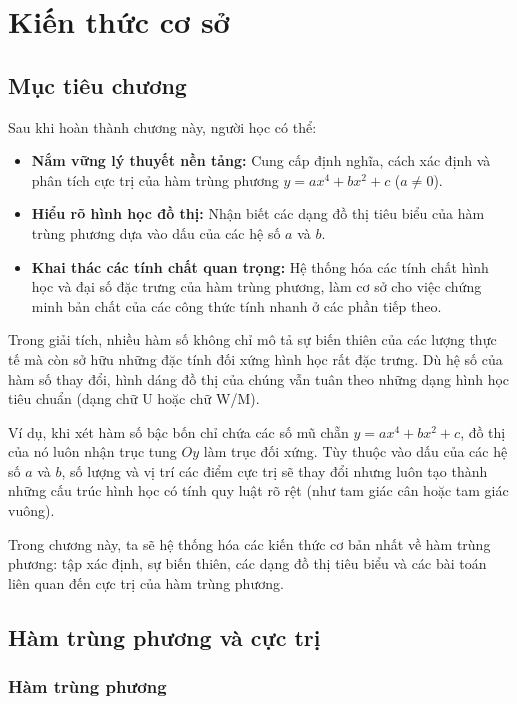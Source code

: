 \section{Kiến thức cơ sở}
\subsection{Mục tiêu chương}
Sau khi hoàn thành chương này, người học có thể:
\begin{itemize}
    \item \textbf{Nắm vững lý thuyết nền tảng:} Cung cấp định nghĩa, cách xác định và phân tích cực trị của hàm trùng phương $y = ax^4 + bx^2 + c$ ($a \neq 0$).
    \item \textbf{Hiểu rõ hình học đồ thị:} Nhận biết các dạng đồ thị tiêu biểu của hàm trùng phương dựa vào dấu của các hệ số $a$ và $b$.
    \item \textbf{Khai thác các tính chất quan trọng:} Hệ thống hóa các tính chất hình học và đại số đặc trưng của hàm trùng phương, làm cơ sở cho việc chứng minh bản chất của các công thức tính nhanh ở các phần tiếp theo.
\end{itemize}
\vspace{0.5cm}
Trong giải tích, nhiều hàm số không chỉ mô tả sự biến thiên của các lượng thực tế mà còn sở hữu những đặc tính đối xứng hình học rất đặc trưng. Dù hệ số của hàm số thay đổi, hình dáng đồ thị của chúng vẫn tuân theo những dạng hình học tiêu chuẩn (dạng chữ U hoặc chữ W/M).

Ví dụ, khi xét hàm số bậc bốn chỉ chứa các số mũ chẵn $y = ax^4 + bx^2 + c$, đồ thị của nó luôn nhận trục tung $Oy$ làm trục đối xứng. Tùy thuộc vào dấu của các hệ số $a$ và $b$, số lượng và vị trí các điểm cực trị sẽ thay đổi nhưng luôn tạo thành những cấu trúc hình học có tính quy luật rõ rệt (như tam giác cân hoặc tam giác vuông).

Trong chương này, ta sẽ hệ thống hóa các kiến thức cơ bản nhất về hàm trùng phương: tập xác định, sự biến thiên, các dạng đồ thị tiêu biểu và các bài toán liên quan đến cực trị của hàm trùng phương.


\subsection{Hàm trùng phương và cực trị}

\subsubsection{Hàm trùng phương}

